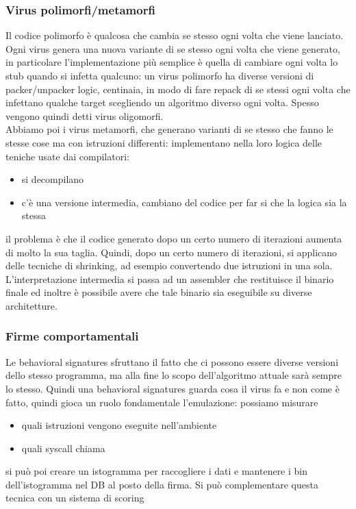 \documentclass[12pt, oneside]{extbook} %
\begin{document}
\subsubsection{Virus polimorfi/metamorfi}
Il codice polimorfo è qualcosa che cambia se stesso ogni volta che viene lanciato. Ogni virus genera una nuova variante di se stesso ogni volta che viene generato, in particolare l'implementazione più semplice è quella di cambiare ogni volta lo stub quando si infetta qualcuno: un virus polimorfo ha diverse versioni di packer/unpacker logic, centinaia, in modo di fare repack di se stessi ogni volta che infettano qualche target scegliendo un algoritmo diverso ogni volta. Spesso vengono quindi detti virus oligomorfi.\\Abbiamo poi i virus metamorfi, che generano varianti di se stesso che fanno le stesse cose ma con istruzioni differenti: implementano nella loro logica delle teniche usate dai compilatori:
\begin{itemize}
\item si decompilano
\item c'è una versione intermedia, cambiano del codice per far si che la logica sia la stessa
\end{itemize}
il problema è che il codice generato dopo un certo numero di iterazioni aumenta di molto la sua taglia. Quindi, dopo un certo numero di iterazioni, si applicano delle tecniche di shrinking, ad esempio convertendo due istruzioni in una sola. L'interpretazione intermedia si passa ad un assembler che restituisce il binario finale ed inoltre è possibile avere che tale binario sia eseguibile su diverse architetture.

\subsubsection{Firme comportamentali}
Le behavioral signatures sfruttano il fatto che ci possono essere diverse versioni dello stesso programma, ma alla fine lo scopo dell'algoritmo attuale sarà sempre lo stesso. Quindi una behavioral signatures guarda cosa il virus fa e non come è fatto, quindi gioca un ruolo fondamentale l'emulazione: possiamo misurare 
\begin{itemize}
\item quali istruzioni vengono eseguite nell'ambiente
\item quali syscall chiama
\end{itemize}
si può poi creare un istogramma per raccogliere i dati e mantenere i bin dell'istogramma nel DB al posto della firma. Si può complementare questa tecnica con un sistema di scoring
\end{document}
